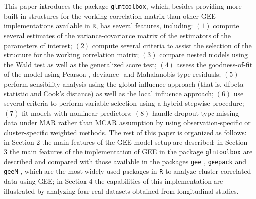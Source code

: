 This paper introduces the package {\tt glmtoolbox}, which, besides providing more built-in structures for the working correlation matrix than other GEE implementations available in {\tt R}, has several features, including: $(1)$ compute several estimates of the variance-covariance matrix of the estimators of the parameters of interest; $(2)$ compute several criteria to assist the selection of the structure for the working correlation matrix; $(3)$ compare nested models using the Wald test as well as the generalized score test; $(4)$ assess the goodness-of-fit of the model using Pearson-, deviance- and Mahalanobis-type residuals; $(5)$ perform sensibility analysis using the global influence approach (that is, dfbeta statistic and Cook's distance) as well as the local influence approach; $(6)$ use several criteria to perform variable selection using a hybrid stepwise procedure; $(7)$ fit models with nonlinear predictors; $(8)$ handle dropout-type missing data under MAR rather than MCAR assumption by using observation-specific or cluster-specific weighted methods. The rest of this paper is organized as follows: in Section 2 the main features of the GEE model setup are described; in Section 3 the main features of the implementation of GEE in the package {\tt glmtoolbox} are described and compared with those available in the packages {\tt gee} \citep{C22}, {\tt geepack} \citep{Yan02,HHY05} and {\tt geeM} \citep{MNHR13}, which are the most widely used packages in {\tt R} to analyze cluster correlated data using GEE; in Section 4 the capabilities of this implementation are illustrated by analyzing four real datasets obtained from longitudinal studies.


